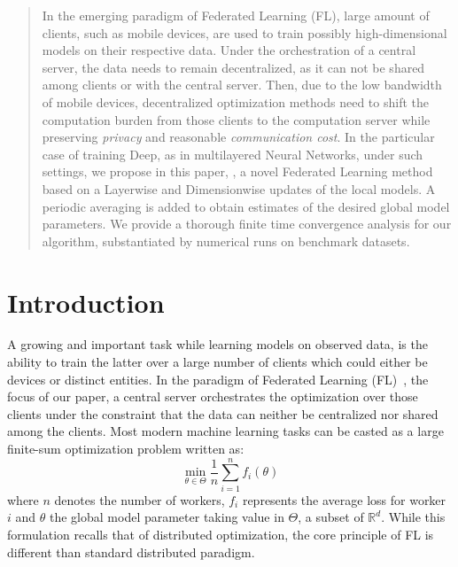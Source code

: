 \documentclass{article}
\begin{document}
\begin{abstract}
In the emerging paradigm of Federated Learning (FL), large amount of clients, such as mobile devices, are used to train possibly high-dimensional models on their respective data.
Under the orchestration of a central server, the data needs to remain decentralized, as it can not be shared among clients or with the central server.
Then, due to the low bandwidth of mobile devices, decentralized optimization methods need to shift the computation burden from those clients to the computation server while preserving \emph{privacy} and reasonable \emph{communication cost}.
In the particular case of training Deep, as in multilayered Neural Networks, under such settings, we propose in this paper, \algo, a novel Federated Learning method based on a Layerwise and Dimensionwise updates of the local models. 
A periodic averaging is added to obtain estimates of the desired global model parameters.
We provide a thorough finite time convergence analysis for our algorithm, substantiated by numerical runs on benchmark datasets.
\end{abstract}

\section{Introduction}\label{sec:introduction}

A growing and important task while learning models on observed data, is the ability to train the latter over a large number of clients which could either be devices or distinct entities.
In the paradigm of Federated Learning (FL)~\citep{konevcny2016federated,mcmahan2017communication}, the focus of our paper, a central server orchestrates the optimization over those clients under the constraint that the data can neither be centralized nor shared among the clients.
Most modern machine learning tasks can be casted as a large finite-sum optimization problem written as:
\begin{equation}\label{eq:opt}
\min \limits_{\theta \in \Theta} \frac{1}{n} \sum_{i=1}^n f_i(\theta)
\end{equation}
where $n$ denotes the number of workers, $f_i$ represents the average loss for worker $i$ and $\theta$ the global model parameter taking value in $\Theta$, a subset of $\mathbb{R}^d$.
While this formulation recalls that of distributed optimization, the core principle of FL is different than standard distributed paradigm.
\end{document}
